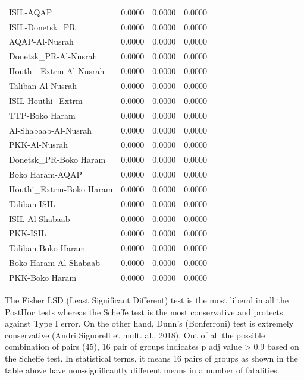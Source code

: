 \documentclass[11pt,oneside,a4paper]{reedthesis}
\begin{document}
\begin{table}[H]
\begin{tabular}[t]{lrrr}
ISIL-AQAP & 0.0000 & 0.0000 & 0.0000\\
ISIL-Donetsk\_PR & 0.0000 & 0.0000 & 0.0000\\
AQAP-Al-Nusrah & 0.0000 & 0.0000 & 0.0000\\
Donetsk\_PR-Al-Nusrah & 0.0000 & 0.0000 & 0.0000\\
\addlinespace
Houthi\_Extrm-Al-Nusrah & 0.0000 & 0.0000 & 0.0000\\
Taliban-Al-Nusrah & 0.0000 & 0.0000 & 0.0000\\
ISIL-Houthi\_Extrm & 0.0000 & 0.0000 & 0.0000\\
TTP-Boko Haram & 0.0000 & 0.0000 & 0.0000\\
Al-Shabaab-Al-Nusrah & 0.0000 & 0.0000 & 0.0000\\
\addlinespace
PKK-Al-Nusrah & 0.0000 & 0.0000 & 0.0000\\
Donetsk\_PR-Boko Haram & 0.0000 & 0.0000 & 0.0000\\
Boko Haram-AQAP & 0.0000 & 0.0000 & 0.0000\\
Houthi\_Extrm-Boko Haram & 0.0000 & 0.0000 & 0.0000\\
Taliban-ISIL & 0.0000 & 0.0000 & 0.0000\\
\addlinespace
ISIL-Al-Shabaab & 0.0000 & 0.0000 & 0.0000\\
PKK-ISIL & 0.0000 & 0.0000 & 0.0000\\
Taliban-Boko Haram & 0.0000 & 0.0000 & 0.0000\\
Boko Haram-Al-Shabaab & 0.0000 & 0.0000 & 0.0000\\
PKK-Boko Haram & 0.0000 & 0.0000 & 0.0000\\
\bottomrule
\end{tabular}
\end{table}
The Fisher LSD (Least Significant Different) test is the most liberal in
all the PostHoc tests whereas the Scheffe test is the most conservative
and protects against Type I error. On the other hand, Dunn's
(Bonferroni) test is extremely conservative (Andri Signorell et mult.
al., 2018). Out of all the possible combination of pairs (45), 16 pair
of groups indicates p adj value \textgreater{} 0.9 based on the Scheffe
test. In statistical terms, it means 16 pairs of groups as shown in the
table above have non-significantly different means in a number of
fatalities.
\end{document}
